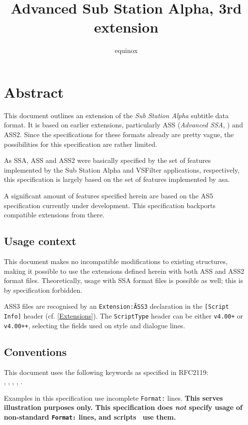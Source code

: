 \documentclass{spec}
\begin{document}
\title{Advanced Sub Station Alpha, 3rd extension}
\author{equinox}
\spectitle

\section{Abstract}
This document outlines an extension of the \emph{Sub Station Alpha}\cite{SSA}
subtitle data format. It is based on earlier extensions, particularly
ASS (\emph{Advanced SSA}, \cite{ASS}) and ASS2\cite{ASS2}. Since the
specifications for these formats already are pretty vague, the possibilities
for this specification are rather limited.

As SSA, ASS and ASS2 were basically specified by the set of features
implemented by the Sub Station Alpha and VSFilter\cite{VSFilter} applications,
respectively, this specification is largely based on the set of features
implemented by asa\cite{asa}.

A significant amount of features specified herein are based on the
AS5\cite{AS5} specification currently under development. This specification
backports compatible extensions from there.

\subsection{Usage context}
This document makes no incompatible modifications to existing structures,
making it possible to use the extensions defined herein with both ASS and
ASS2 format files. Theoretically, usage with SSA format files is possible
as well; this is by specification forbidden.

ASS3 files are recognised by an \texttt{Extension:\~ASS3} declaration in the
\texttt{[Script Info]} header (cf. \ref{Extensions}). The \texttt{ScriptType}
header can be either \texttt{v4.00+} or \texttt{v4.00++}, selecting the
fields used on style and dialogue lines.

\subsection{Conventions}
This document uses the following keywords as specified in RFC2119\cite{2119}:\\
\may, \should, \shouldnot, \must, \mustnot.

Examples in this specification use incomplete \texttt{Format:} lines.
\textbf{This serves illustration purposes only. This specification does \emph{not}
specify usage of non-standard \texttt{Format:} lines, and scripts \mustnot\ use them.}
\end{document}
